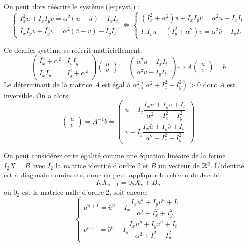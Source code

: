\begin{enumerate}[questions]
On peut alors réécrire le système (\ref{eq:syst}) :
\[ 
\begin{cases*}
I_x^2u + I_xI_yv = \alpha^2(\bar{u} - u) - I_xI_t \\
I_xI_yu + I_y^2v = \alpha^2(\bar{v} - v) - I_yI_t
\end{cases*}
\iff 
\begin{cases*}
(I_x^2 + \alpha^2)u + I_xI_yv = \alpha^2\bar{u} - I_xI_t \\
I_xI_yu + (I_y^2 + \alpha^2)v = \alpha^2\bar{v} - I_yI_t
\end{cases*}
\]

Ce dernier système se réécrit matriciellement:
\[
\begin{pmatrix}
I_x^2 + \alpha^2 & I_xI_y \\
I_xI_y & I_y^2 + \alpha^2
\end{pmatrix}
\begin{pmatrix}
u \\ v
\end{pmatrix} = 
\begin{pmatrix}
\alpha^2\bar{u} - I_xI_t \\
\alpha^2\bar{v} - I_yI_t
\end{pmatrix} \iff
A
\begin{pmatrix}
u \\ v
\end{pmatrix} = b
\]
Le déterminant de la matrice  $A$ est égal à $\alpha^2(\alpha^2 + I_x^2 + I_y^2) > 0$ donc $A$ est inversible. On a alors:
\[ \begin{pmatrix}
u \\ v
\end{pmatrix} = A^{-1}b = 
\begin{pmatrix}
\bar{u} - I_x \dfrac{I_x\bar{u} + I_y\bar{v} + I_t}{\alpha^2 + I_x^2 + I_y^2} \\
\bar{v} - I_y \dfrac{I_x\bar{u} + I_y\bar{v} + I_t}{\alpha^2 + I_x^2 + I_y^2}
\end{pmatrix}
\]

On peut considérer cette égalité comme une équation linéaire de la forme $I_2X = B$ avec $I_2$ la matrice identité d'ordre 2 et $B$ un vecteur de $\mathbb{R}^2$. L'identité est à diagonale dominante, donc on peut appliquer le schéma de Jacobi:
\[ I_2X_{n+1} = 0_2X_n + B_n \]
où $0_2$ est la matrice nulle d'ordre 2, soit encore:
\[ \begin{cases*}
u^{n+1} = \bar{u}^n - I_x \dfrac{I_x\bar{u}^n + I_y\bar{v}^n + I_t}{\alpha^2 + I_x^2 + I_y^2} \\
v^{n+1} = \bar{v}^n - I_y \dfrac{I_x\bar{u}^n + I_y\bar{v}^n + I_t}{\alpha^2 + I_x^2 + I_y^2}
\end{cases*} \]


\end{enumerate}
